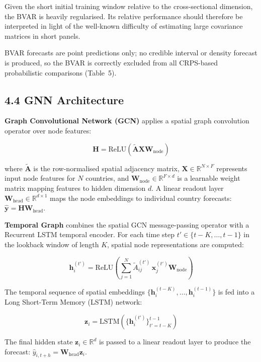 \documentclass[
]{article}
\begin{document}
Given the short initial training window relative to the cross-sectional dimension, the BVAR is heavily regularised. Its relative performance should therefore be interpreted in light of the well-known difficulty of estimating large covariance matrices in short panels.

BVAR forecasts are point predictions only; no credible interval or density forecast is produced, so the BVAR is correctly excluded from all CRPS-based probabilistic comparisons (Table~5).

\subsection{4.4 GNN Architecture}\label{gnn-architecture}

\textbf{Graph Convolutional Network (GCN)} applies a spatial graph convolution operator over node features:

\[\mathbf{H} = \mathrm{ReLU}\!\left(\tilde{\mathbf{A}}\mathbf{X}\mathbf{W}_{\text{node}}\right)\]

where \(\tilde{\mathbf{A}}\) is the row-normalised spatial adjacency matrix, \(\mathbf{X} \in \mathbb{R}^{N \times F}\) represents input node features for \(N\) countries, and \(\mathbf{W}_{\text{node}} \in \mathbb{R}^{F \times d}\) is a learnable weight matrix mapping features to hidden dimension \(d\). A linear readout layer \(\mathbf{W}_{\text{head}} \in \mathbb{R}^{d \times 1}\) maps the node embeddings to individual country forecasts: \(\hat{\mathbf{y}} = \mathbf{H}\mathbf{W}_{\text{head}}\).

\textbf{Temporal Graph} combines the spatial GCN message-passing operator with a Recurrent LSTM temporal encoder. For each time step \(t' \in \{t-K, \dots, t-1\}\) in the lookback window of length \(K\), spatial node representations are computed:

\[\mathbf{h}_i^{(t')} = \mathrm{ReLU}\!\left(\sum_{j=1}^N \tilde{A}_{ij}^{(t')}\,\mathbf{x}_j^{(t')}\mathbf{W}_{\text{node}}\right)\]

The temporal sequence of spatial embeddings \(\{\mathbf{h}_i^{(t-K)}, \dots, \mathbf{h}_i^{(t-1)}\}\) is fed into a Long Short-Term Memory (LSTM) network:

\[\mathbf{z}_i = \mathrm{LSTM}\!\left(\{\mathbf{h}_i^{(t')}\}_{t'=t-K}^{t-1}\right)\]

The final hidden state \(\mathbf{z}_i \in \mathbb{R}^d\) is passed to a linear readout layer to produce the forecast: \(\hat{y}_{i, t+h} = \mathbf{W}_{\text{head}}\mathbf{z}_i\).
\end{document}
